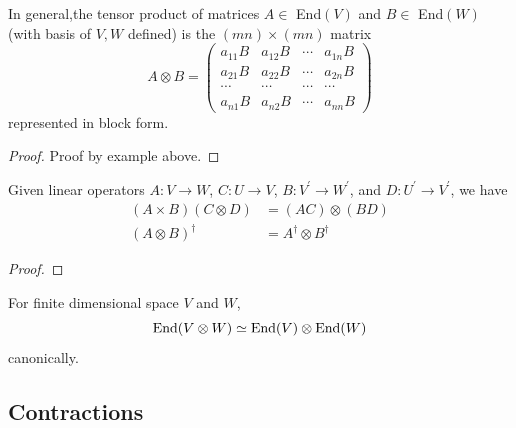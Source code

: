	\begin{theorem}
	  \label{thm:matrix-realization-of-tensor-product-operators}
    In general,the tensor product of matrices $A \in $ End$(V)$ and $B \in $ End$(W)$ (with basis of $V, W$ defined) is the $(m n) \times (m n)$ matrix
		\begin{equation}
			A \otimes B = \begin{pmatrix}
				a_{11} B & a_{12} B & \cdots & a_{1n} B \\
				a_{21} B & a_{22} B & \cdots & a_{2n} B \\
				\cdots & \cdots & \cdots & \cdots \\
				a_{n1} B & a_{n2} B & \cdots & a_{nn} B 
			\end{pmatrix}
		\end{equation}
    represented in block form. 
  \end{theorem}
	\begin{proof}
	  Proof by example above. 
	\end{proof}

	\begin{lemma}
	  \label{thm:properties-of-tensor-products-of-linear}
		Given linear operators $A: V \to W$, $C: U \to V$, $B: V^\prime \to W^\prime$, and $D: U^\prime \to V^\prime$, we have 
		\begin{align}
			(A \times B)(C \otimes D) & = (AC) \otimes (BD) \\ 
			(A \otimes B)^\dagger & = A^\dagger \otimes B^\dagger
		\end{align}
	\end{lemma}
	\begin{proof}
	  
	\end{proof}

	\begin{theorem}
	  \label{thm:endomorphisms-of-a-tensor-product}
    For finite dimensional space $V$ and $W$, 
		\begin{equation}
    	\operatorname{End}(V \otimes W) \simeq \operatorname{End}(V) \otimes \operatorname{End}(W)
		\end{equation}
		canonically. 
  \end{theorem}

\subsection{Contractions}

